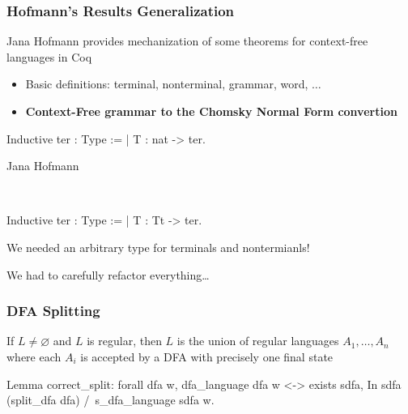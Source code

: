 \documentclass[xcolor=table]{beamer}
\begin{document}
\begin{frame}[fragile] \frametitle{Hofmann's Results Generalization}

Jana Hofmann provides mechanization of some theorems for context-free languages in Coq
\begin{itemize}
    \item Basic definitions: terminal, nonterminal, grammar, word, $\dots$
    \pause
    \item \textbf{Context-Free grammar to the Chomsky Normal Form convertion}
\end{itemize}
\pause

\begin{center}
  \begin{minipage}[t]{0.47\textwidth}
\begin{center}
    \begin{pyglist}[language=coq, numbers=none, numbersep=5pt]
    Inductive ter : Type :=
     | T : nat -> ter.
  	\end{pyglist}

    Jana Hofmann
  \end{center}
  \end{minipage}
  \pause
  ~ \vline \vline ~
  \begin{minipage}[t]{0.47\textwidth}
\begin{center}
    \begin{pyglist}[language=coq, numbers=none, numbersep=5pt]
    Inductive ter : Type :=
     | T : Tt -> ter.
    \end{pyglist}

    We needed an arbitrary type for terminals and nontermianls!
  \end{center}
  \end{minipage}

\pause
\vspace{0.5cm}
We had to carefully refactor everything\dots
\end{center}


\end{frame}


\begin{frame}[fragile] \frametitle{DFA Splitting}
If $ L \neq \varnothing $ and $L$ is regular, then $L$ is the union of regular languages $A_1, \ldots , A_n$ where each $A_i$ is accepted by a DFA with precisely one final state
\pause
\begin{pyglist}[language=coq, numbers=none, numbersep=5pt]
Lemma correct_split:
   forall dfa w,
     dfa_language dfa w <->
     exists sdfa,
        In sdfa (split_dfa dfa) /\ s_dfa_language sdfa w.
\end{pyglist}
\end{frame}
\end{document}
